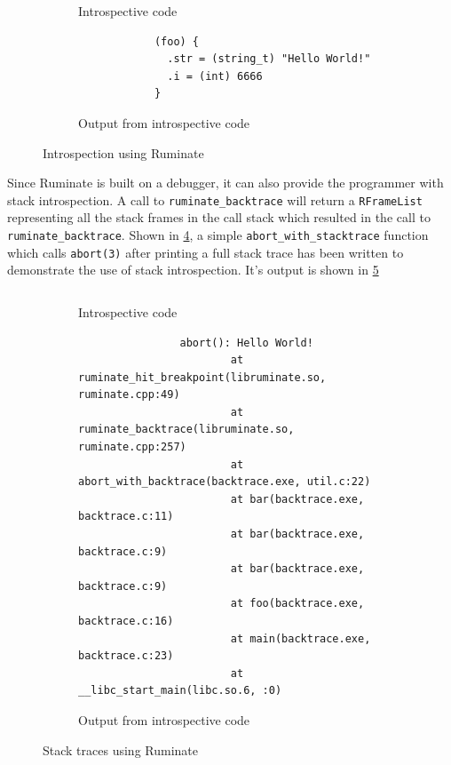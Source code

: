 \documentclass{report}
\begin{document}

\begin{figure}
	\begin{subfigure}{\linewidth}
		{
			\footnotesize
			\inputminted[tabsize=2]{c}{struct_introspect.c}
		}
		\caption{Introspective code}
		\label{fig:struct_introspect_code}
	\end{subfigure}
	\begin{subfigure}{\linewidth}
		\begin{verbatim}
			(foo) {
			  .str = (string_t) "Hello World!"
			  .i = (int) 6666
			}
		\end{verbatim}
		\caption{Output from introspective code}
		\label{fig:struct_introspect_output}
	\end{subfigure}
	\caption{Introspection using Ruminate}
	\label{fig:struct_introspect}
\end{figure}

Since Ruminate is built on a debugger, it can also provide the programmer with
stack introspection. A call to \lstinline|ruminate_backtrace| will return a
\lstinline|RFrameList| representing all the stack frames in the call stack which
resulted in the call to \lstinline|ruminate_backtrace|. Shown in
\cref{fig:abort_with_stacktrace_code}, a simple
\lstinline|abort_with_stacktrace| function which calls \lstinline|abort(3)|
\autocite{abort} after printing a full stack trace has been written to
demonstrate the use of stack introspection. It's output is shown in
\cref{fig:abort_with_stacktrace_output}

\begin{figure}
	\begin{subfigure}{\linewidth}
		{
			\footnotesize
			\inputminted[tabsize=2]{c}{backtrace.c}
		}
		\caption{Introspective code}
		\label{fig:abort_with_stacktrace_code}
	\end{subfigure}
	\begin{subfigure}{\linewidth}
		{
			\footnotesize
			\begin{verbatim}
				abort(): Hello World!
				        at ruminate_hit_breakpoint(libruminate.so, ruminate.cpp:49)
				        at ruminate_backtrace(libruminate.so, ruminate.cpp:257)
				        at abort_with_backtrace(backtrace.exe, util.c:22)
				        at bar(backtrace.exe, backtrace.c:11)
				        at bar(backtrace.exe, backtrace.c:9)
				        at bar(backtrace.exe, backtrace.c:9)
				        at foo(backtrace.exe, backtrace.c:16)
				        at main(backtrace.exe, backtrace.c:23)
				        at __libc_start_main(libc.so.6, :0)
			\end{verbatim}
		}
		\caption{Output from introspective code}
		\label{fig:abort_with_stacktrace_output}
	\end{subfigure}
	\caption{Stack traces using Ruminate}
	\label{fig:abort_with_stacktrace}
\end{figure}
\end{document}
